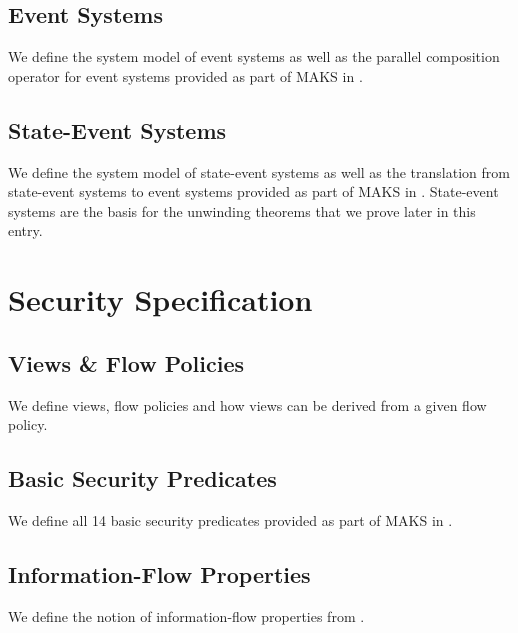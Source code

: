 \documentclass[10pt,a4paper]{article}
\begin{document}
\subsection{Event Systems}
We define the system model of event systems as well as the parallel composition operator for event systems provided as part of MAKS in {\cite{phd:Mantel2003}}.\\



\subsection{State-Event Systems}
We define the system model of state-event systems as well as the translation from state-event systems to event systems provided as part of MAKS in {\cite{phd:Mantel2003}}.
State-event systems are the basis for the unwinding theorems that we prove later in this entry.\\



\section{Security Specification}

\subsection{Views \& Flow Policies}
We define views, flow policies and how views can be derived from a given flow policy.\\





\subsection{Basic Security Predicates}
We define all 14 basic security predicates provided as part of MAKS in {\cite{phd:Mantel2003}}.\\



\subsection{Information-Flow Properties}
We define the notion of information-flow properties from {\cite{phd:Mantel2003}}.\\
\end{document}

